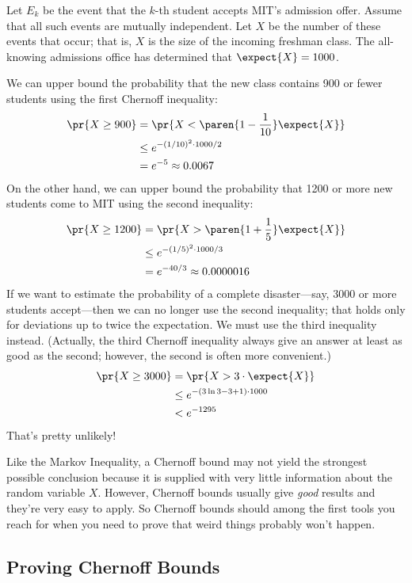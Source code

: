 \begin{editingnotes}
Let $E_k$ be the event that the $k$-th student accepts MIT's admission
offer.  Assume that all such events are mutually independent.  Let $X$
be the number of these events that occur; that is, $X$ is the size of
the incoming freshman class.  The all-knowing admissions office has
determined that $\expect{X} = 1000$.

We can upper bound the probability that the new class contains 900 or
fewer students using the first Chernoff inequality:
%
\begin{align*}
\pr{X \geq 900}
    & = \pr{X < \paren{1 - \frac{1}{10}} \expect{X}} \\
    & \leq e^{- (1/10)^2 \cdot 1000 / 2} \\
    & = e^{-5} \approx 0.0067
\end{align*}
%
On the other hand, we can upper bound the probability that 1200 or
more new students come to MIT using the second inequality:
%
\begin{align*}
\pr{X \geq 1200}
    & = \pr{X > \paren{1 + \frac{1}{5}} \expect{X}} \\
    & \leq e^{- (1/5)^2 \cdot 1000 / 3} \\
    & = e^{-40/3} \approx 0.0000016
\end{align*}
%
If we want to estimate the probability of a complete disaster---say,
3000 or more students accept---then we can no longer use the second
inequality; that holds only for deviations up to twice the
expectation.  We must use the third inequality instead.  (Actually,
the third Chernoff inequality always give an answer at least as good
as the second; however, the second is often more convenient.)
%
\begin{align*}
\pr{X \geq 3000}
    & = \pr{X > 3 \cdot \expect{X}} \\
    & \leq e^{-(3 \ln 3 - 3 + 1) \cdot 1000} \\
    & < e^{-1295}
\end{align*}
%
That's pretty unlikely!  

Like the Markov Inequality, a Chernoff bound may not yield the
strongest possible conclusion because it is supplied with very little
information about the random variable $X$.  However, Chernoff bounds
usually give \textit{good} results and they're very easy to apply.  So
Chernoff bounds should among the first tools you reach for when you
need to prove that weird things probably won't happen.

\subsection{Proving Chernoff Bounds}


\end{editingnotes}
